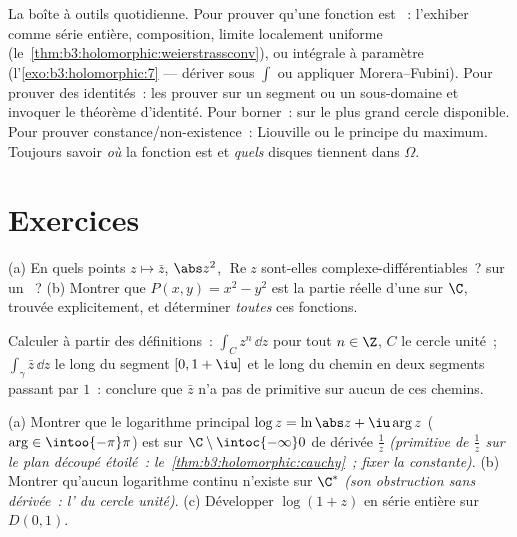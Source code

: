 \begin{method}\label{met:b3:holomorphic:toolkit}
La boîte à outils quotidienne. Pour prouver qu'une fonction
est ~: l'exhiber comme série entière, composition,
limite localement uniforme (le~\cref{thm:b3:holomorphic:weierstrassconv}),
ou intégrale à paramètre  (l'\cref{exo:b3:holomorphic:7}
--- dériver sous $\int$ ou appliquer Morera--Fubini). Pour
prouver des identités~: les prouver sur un segment ou un
sous-domaine et invoquer le théorème d'identité. Pour borner~:
 sur le plus grand cercle disponible. Pour
prouver constance/non-existence~: Liouville ou le principe du
maximum. Toujours savoir \emph{où} la fonction est  et
\emph{quels} disques tiennent dans $\Omega$.
\end{method}

\section{Exercices}

\begin{exercise}[$\star$]\label{exo:b3:holomorphic:1}
(a) En quels points $z \mapsto \bar z$, $\abs z^2$,
$\operatorname{Re}z$ sont-elles complexe-différentiables~?
 sur un ~?
(b) Montrer que $P(x, y) = x^2 - y^2$ est la partie réelle
d'une  sur $\C$, trouvée explicitement, et
déterminer \emph{toutes} ces fonctions.
\end{exercise}

\begin{exercise}[$\star$]\label{exo:b3:holomorphic:2}
Calculer à partir des définitions~: $\int_{C}z^n\,\dd z$ pour
tout $n \in \Z$, $C$ le cercle unité~; $\int_\gamma\bar z\,\dd
z$ le long du segment $[0, 1+\iu]$ et le long du chemin en
deux segments passant par $1$~: conclure que $\bar z$ n'a pas
de primitive sur aucun  de ces chemins.
\end{exercise}

\begin{exercise}[$\star\star$]\label{exo:b3:holomorphic:3}
(a) Montrer que le logarithme principal $\log z = \ln\abs z +
\iu\arg z$ ($\arg \in \intoo{-\pi}\pi$) est  sur
$\C\setminus\intoc{-\infty}0$ de dérivée $\frac1z$
\emph{(primitive de $\frac1z$ sur le plan découpé étoilé~:
le~\cref{thm:b3:holomorphic:cauchy}~; fixer la constante)}.
(b) Montrer qu'aucun logarithme continu n'existe sur $\C^*$
\emph{(son obstruction sans dérivée~: l' du cercle
unité)}.
(c) Développer $\log(1 + z)$ en série entière sur $D(0,1)$.
\end{exercise}

